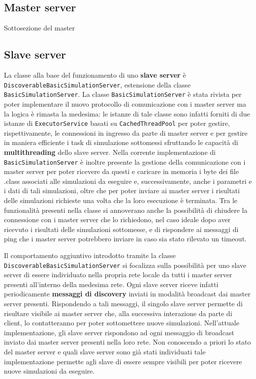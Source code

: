 \subsection{Master server}

Sottosezione del master

\subsection{Slave server}
La classe alla base del funzionamento di uno \textbf{slave server} è \texttt{DiscoverableBasicSimulationServer}, estensione della classe \texttt{BasicSimulationServer}.
La classe \texttt{BasicSimulationServer} è stata rivista per poter implementare il nuovo protocollo di comunicazione con i master server ma la logica è rimasta la medesima:
le istanze di tale classe sono infatti forniti di due istanze di \texttt{ExecutorService} basati su \texttt{CachedThreadPool} per poter gestire, rispettivamente, le connessioni in ingresso da parte di master server
e per gestire in maniera efficiente i task di simulazione sottomessi sfruttando le capacità di \textbf{multithreading} dello slave server.
Nella corrente implementazione di \texttt{BasicSimulationServer} è inoltre presente la gestione della comunicazione con i master server per poter ricevere da questi e caricare in memoria i byte dei file .class associati
alle simulazioni da eseguire e, successivamente, anche i parametri e i dati di tali simulazioni, oltre che per poter inviare ai master server i risultati delle simulazioni richieste una volta che la loro esecuzione è terminata.
Tra le funzionalità presenti nella classe si annoverano anche la possibilità di chiudere la connessione con i master server che lo richiedono, nel caso ideale dopo aver ricevuto i risultati delle simulazioni sottomesse,
e di rispondere ai messaggi di ping che i master server potrebbero inviare in caso sia stato rilevato un timeout. 

Il comportamento aggiuntivo introdotto tramite la classe \texttt{DiscoverableBasicSimulationServer} si focalizza sulla possibilità per uno slave server di essere individuato nella propria rete locale da tutti i master server
presenti all'interno della medesima rete. Ogni slave server riceve infatti periodicamente \textbf{messaggi di discovery} inviati in modalità broadcast dai master server presenti. Rispondendo a tali messaggi, il singolo slave server
permette di risultare visibile ai master server che, alla successiva interazione da parte di client, lo contatteranno per poter sottomettere nuove simulazioni.
Nell'attuale implementazione, gli slave server rispondono ad ogni messaggio di broadcast inviato dai master server presenti nella loro rete. Non conoscendo a priori lo stato del master server e quali slave server sono già stati individuati
tale implementazione permette agli slave di essere sempre visibili per poter ricevere nuove simulazioni da eseguire.
